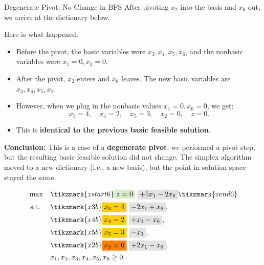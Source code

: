 \begin{remark}{Degenerate Pivot: No Change in BFS}{}
After pivoting \(x_2\) into the basis and \(x_6\) out, we arrive at the dictionary below. 

Here is what happened:

\begin{itemize}
    \item Before the pivot, the basic variables were \(x_3, x_4, x_5, x_6\), and the nonbasic variables were \(x_1 = 0, x_2 = 0\).
    \item After the pivot, \(x_2\) enters and \(x_6\) leaves. The new basic variables are \(x_3, x_4, x_5, x_2\).
    \item However, when we plug in the nonbasic values \(x_1 = 0, x_6 = 0\), we get:
    \[
    x_3 = 4, \quad x_4 = 2, \quad x_5 = 3, \quad x_2 = 0, \quad z = 0.
    \]
    \item This is \textbf{identical to the previous basic feasible solution}.
\end{itemize}

\textbf{Conclusion:}  
This is a case of a \textbf{degenerate pivot}: we performed a pivot step, but the resulting basic feasible solution did not change. The simplex algorithm moved to a new dictionary (i.e., a new basis), but the point in solution space stayed the same.

\vspace{1cm}

\[
\begin{aligned}
\max \quad 
& \tikzmark{zstart6} \text{\colorbox{green!20!white}{$z = 0$}} ~ \text{\colorbox{gray!20!white}{$+ 5x_1 - 2x_6$}} \tikzmark{zend6} \\
\st \quad 
& \tikzmark{x3b} \text{\colorbox{yellow}{$x_3 = 4$}} ~ \text{\colorbox{gray!20!white}{$- 2x_1 + x_6$}},\\ 
& \tikzmark{x4b} \text{\colorbox{yellow}{$x_4 = 2$}} ~ \text{\colorbox{gray!20!white}{$+ x_1 - x_6$}},\\ 
& \tikzmark{x5b} \text{\colorbox{yellow}{$x_5 = 3$}} ~ \text{\colorbox{gray!20!white}{$- x_1$}},\\ 
& \tikzmark{x2b} \text{\colorbox{orange}{$x_2 = 0$}} ~ \text{\colorbox{gray!20!white}{$+ 2x_1 - x_6$}},\\
& x_1, x_2, x_3, x_4, x_5, x_6 \ge 0.
\end{aligned}
\]

\begin{tikzpicture}[remember picture, overlay, >=stealth]


\end{tikzpicture}
\end{remark}
